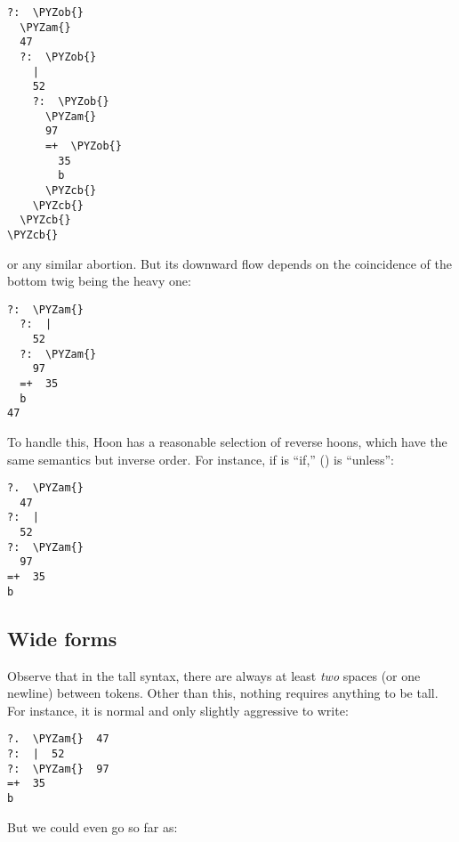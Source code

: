 \begin{framed_shaded}
\begin{Verbatim}[fontsize=\relsize{-2.5},fontseries=b,commandchars=\\\{\}]
?:  \PYZob{}
  \PYZam{}
  47
  ?:  \PYZob{}
    |
    52
    ?:  \PYZob{}
      \PYZam{}
      97
      =+  \PYZob{}
        35
        b
      \PYZcb{}
    \PYZcb{}
  \PYZcb{}
\PYZcb{}
\end{Verbatim}
\end{framed_shaded}
or any similar abortion.  But its downward flow depends on the
coincidence of the bottom twig being the heavy one:

\begin{framed_shaded}
\begin{Verbatim}[fontsize=\relsize{-2.5},fontseries=b,commandchars=\\\{\}]
?:  \PYZam{}
  ?:  |
    52
  ?:  \PYZam{}
    97
  =+  35
  b
47
\end{Verbatim}
\end{framed_shaded}
To handle this, Hoon has a reasonable selection of reverse hoons,
which have the same semantics but inverse order.  For instance,
if  is ``if,''  () is ``unless'':

\begin{framed_shaded}
\begin{Verbatim}[fontsize=\relsize{-2.5},fontseries=b,commandchars=\\\{\}]
?.  \PYZam{}
  47
?:  |
  52
?:  \PYZam{}
  97
=+  35
b
\end{Verbatim}
\end{framed_shaded}

\subsection{Wide forms}

Observe that in the tall syntax, there are always at least \emph{two}
spaces (or one newline) between tokens.  Other than this, nothing
requires anything to be tall.  For instance, it is normal and
only slightly aggressive to write:

\begin{framed_shaded}
\begin{Verbatim}[fontsize=\relsize{-2.5},fontseries=b,commandchars=\\\{\}]
?.  \PYZam{}  47
?:  |  52
?:  \PYZam{}  97
=+  35
b
\end{Verbatim}
\end{framed_shaded}
But we could even go so far as:

